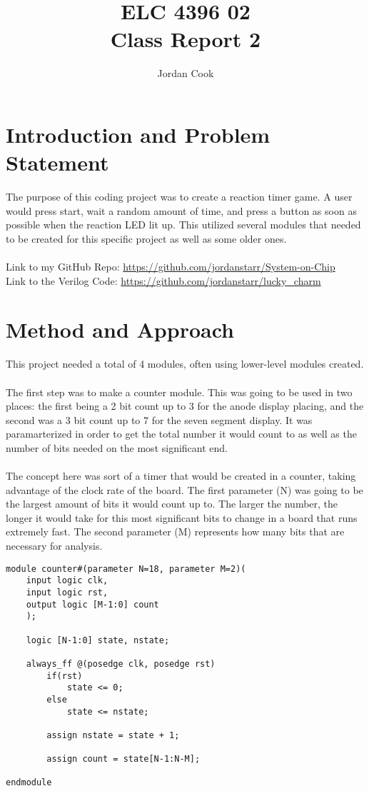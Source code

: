 \documentclass[11pt]{article}
\begin{document}
\title{ELC 4396 02 \\ Class Report 2}
\author{Jordan Cook}

\maketitle


\section*{Introduction and Problem Statement} 

The purpose of this coding project was to create a reaction timer game. A user would press start, wait a random amount of time, and press a button as soon as possible when the reaction LED lit up. This utilized several modules that needed to be created for this specific project as well as some older ones. 
\\\\ Link to my GitHub Repo: \url{https://github.com/jordanstarr/System-on-Chip}
\\ Link to the Verilog Code: \url{https://github.com/jordanstarr/lucky_charm}

\section*{Method and Approach}

This project needed a total of 4 modules, often using lower-level modules created. 
\\\\
The first step was to make a counter module. This was going to be used in two places: the first being a 2 bit count up to 3 for the anode display placing, and the second was a 3 bit count up to 7 for the seven segment display. It was paramarterized in order to get the total number it would count to as well as the number of bits needed on the most significant end. \\\\ The concept here was sort of a timer that would be created in a counter, taking advantage of the clock rate of the board. The first parameter (N) was going to be the largest amount of bits it would count up to. The larger the number, the longer it would take for this most significant bits to change in a board that runs extremely fast. The second parameter (M) represents how many bits that are necessary for analysis.

\begin{lstlisting}[style=Verilog,caption=Counter Module Code,label=code:ex ]
module counter#(parameter N=18, parameter M=2)(
	input logic clk,
	input logic rst,
	output logic [M-1:0] count
	);

	logic [N-1:0] state, nstate; 
	
	always_ff @(posedge clk, posedge rst) 
		if(rst)
			state <= 0; 
		else 
			state <= nstate; 
		
		assign nstate = state + 1; 
		
		assign count = state[N-1:N-M];         

endmodule
\end{lstlisting}
\end{document}
